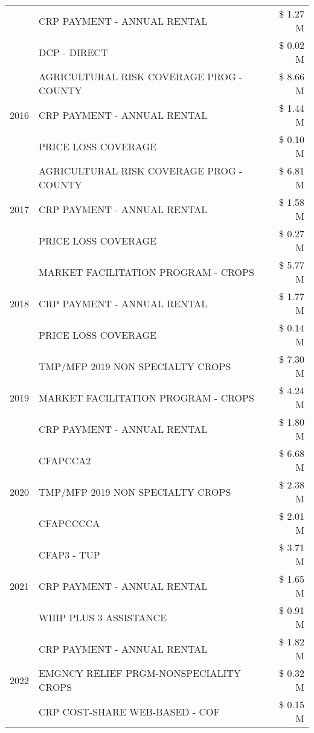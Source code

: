 \begin{tabular}{llr}
 & CRP PAYMENT - ANNUAL RENTAL & \$ 1.27 M \\
 & DCP - DIRECT & \$ 0.02 M \\
\cline{1-3}
\multirow[t]{3}{*}{2016} & AGRICULTURAL RISK COVERAGE PROG - COUNTY & \$ 8.66 M \\
 & CRP PAYMENT - ANNUAL RENTAL & \$ 1.44 M \\
 & PRICE LOSS COVERAGE & \$ 0.10 M \\
\cline{1-3}
\multirow[t]{3}{*}{2017} & AGRICULTURAL RISK COVERAGE PROG - COUNTY & \$ 6.81 M \\
 & CRP PAYMENT - ANNUAL RENTAL & \$ 1.58 M \\
 & PRICE LOSS COVERAGE & \$ 0.27 M \\
\cline{1-3}
\multirow[t]{3}{*}{2018} & MARKET FACILITATION PROGRAM - CROPS & \$ 5.77 M \\
 & CRP PAYMENT - ANNUAL RENTAL & \$ 1.77 M \\
 & PRICE LOSS COVERAGE & \$ 0.14 M \\
\cline{1-3}
\multirow[t]{3}{*}{2019} & TMP/MFP 2019 NON SPECIALTY CROPS & \$ 7.30 M \\
 & MARKET FACILITATION PROGRAM - CROPS & \$ 4.24 M \\
 & CRP PAYMENT - ANNUAL RENTAL & \$ 1.80 M \\
\cline{1-3}
\multirow[t]{3}{*}{2020} & CFAPCCA2 & \$ 6.68 M \\
 & TMP/MFP 2019 NON SPECIALTY CROPS & \$ 2.38 M \\
 & CFAPCCCCA & \$ 2.01 M \\
\cline{1-3}
\multirow[t]{3}{*}{2021} & CFAP3 - TUP & \$ 3.71 M \\
 & CRP PAYMENT - ANNUAL RENTAL & \$ 1.65 M \\
 & WHIP PLUS 3 ASSISTANCE & \$ 0.91 M \\
\cline{1-3}
\multirow[t]{3}{*}{2022} & CRP PAYMENT - ANNUAL RENTAL & \$ 1.82 M \\
 & EMGNCY RELIEF PRGM-NONSPECIALITY CROPS & \$ 0.32 M \\
 & CRP COST-SHARE WEB-BASED - COF & \$ 0.15 M \\
\cline{1-3}
\bottomrule
\end{tabular}
